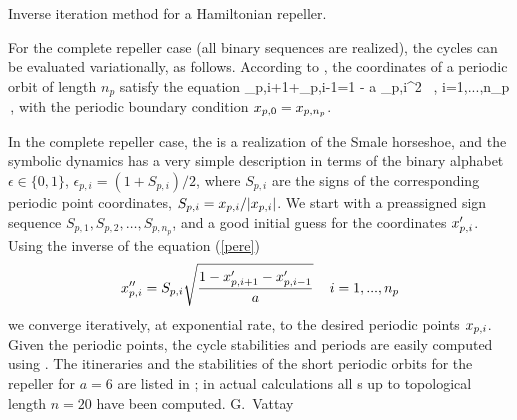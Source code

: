 

         {Inverse iteration method for a Hamiltonian repeller.}{
For the complete repeller case (all binary sequences are realized),
the cycles can be evaluated variationally, as follows.
According to ,
the coordinates of a periodic orbit of
length $n_p$ satisfy the  equation
                                \toCB
\beq
\ssp_{p,i+1}+\ssp_{p,i-1}=1 -  a \ssp_{p,i}^2 \, ,
\quad i=1,...,n_p
\,,
\label{e:pere}
\eeq
with the periodic boundary condition
$x_{p,0}=x_{p,n_p}$.

In the complete repeller case, the {\HenonMap} is a realization
of the Smale horseshoe, and the symbolic dynamics has a very simple
description in terms of the
binary alphabet  $\epsilon \in \{ 0,1 \}$,
$\epsilon_{p,i}=(1+S_{p,i})/2$, where $S_{p,i}$ are the
signs of the corresponding periodic point coordinates,
$S_{p,i}=x_{p,i}/|x_{p,i}|$.
We start with a preassigned sign sequence
$S_{p,1},S_{p,2}, \dots, S_{p,n_p}$, and a
good  initial guess for the coordinates $x_{p,i}'$.
Using the inverse of the equation (\ref{pere})
\[
x_{p,i}''=S_{p,i}\sqrt{\frac{1-x_{p,i+1}'-x_{p,i-1}'}{a}}
\,\quad i=1,...,n_p
\]
we converge iteratively, at exponential rate, to the desired
periodic points $x_{p,i}$. Given the periodic points, the cycle
stabilities and periods are easily computed using
. The itineraries and the stabilities of the short
periodic orbits for the {\Henon} repeller  for
$a=6$ are listed in ; in actual
calculations all {\orbit}s up to topological length $n=20$
have been computed.
%
\hfill G.~Vattay
} %
